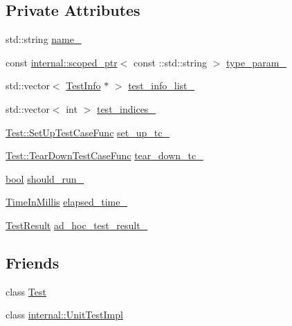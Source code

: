 \subsection*{Private Attributes}
\begin{DoxyCompactItemize}
\item 
std\+::string \hyperlink{classtesting_1_1TestCase_a6c16e28e7555dc6a158415b3bfc4f833}{name\+\_\+}
\item 
const \hyperlink{classtesting_1_1internal_1_1scoped__ptr}{internal\+::scoped\+\_\+ptr}$<$ const \+::std\+::string $>$ \hyperlink{classtesting_1_1TestCase_a4952403fca9baa20275b3fcdc28977db}{type\+\_\+param\+\_\+}
\item 
std\+::vector$<$ \hyperlink{classtesting_1_1TestInfo}{Test\+Info} $\ast$ $>$ \hyperlink{classtesting_1_1TestCase_adce272a48399dd67a7bdd14fa7e99b80}{test\+\_\+info\+\_\+list\+\_\+}
\item 
std\+::vector$<$ int $>$ \hyperlink{classtesting_1_1TestCase_a6bb04b98c46a3eecf7a4e6f62593a827}{test\+\_\+indices\+\_\+}
\item 
\hyperlink{classtesting_1_1Test_a5f2a051d1d99c9b784c666c586186cf9}{Test\+::\+Set\+Up\+Test\+Case\+Func} \hyperlink{classtesting_1_1TestCase_a272e1bcea07b9654ffc5470e64579d35}{set\+\_\+up\+\_\+tc\+\_\+}
\item 
\hyperlink{classtesting_1_1Test_aa0f532e93b9f3500144c53f31466976c}{Test\+::\+Tear\+Down\+Test\+Case\+Func} \hyperlink{classtesting_1_1TestCase_a0ceb56d10b167cfc51a286a7b9b2fbbc}{tear\+\_\+down\+\_\+tc\+\_\+}
\item 
\hyperlink{classbool}{bool} \hyperlink{classtesting_1_1TestCase_a2f98fefe1f624c879e0320882c561d85}{should\+\_\+run\+\_\+}
\item 
\hyperlink{namespacetesting_a992de1d091ce660f451d1e8b3ce30fd6}{Time\+In\+Millis} \hyperlink{classtesting_1_1TestCase_a0379c376d8832e6fd1d5d9c7c3c32759}{elapsed\+\_\+time\+\_\+}
\item 
\hyperlink{classtesting_1_1TestResult}{Test\+Result} \hyperlink{classtesting_1_1TestCase_a4aec85d3398a4a0161f1cde69c07aadc}{ad\+\_\+hoc\+\_\+test\+\_\+result\+\_\+}
\end{DoxyCompactItemize}
\subsection*{Friends}
\begin{DoxyCompactItemize}
\item 
class \hyperlink{classtesting_1_1TestCase_a5b78b1c2e1fa07ffed92da365593eaa4}{Test}
\item 
class \hyperlink{classtesting_1_1TestCase_acc0a5e7573fd6ae7ad1878613bb86853}{internal\+::\+Unit\+Test\+Impl}
\end{DoxyCompactItemize}


